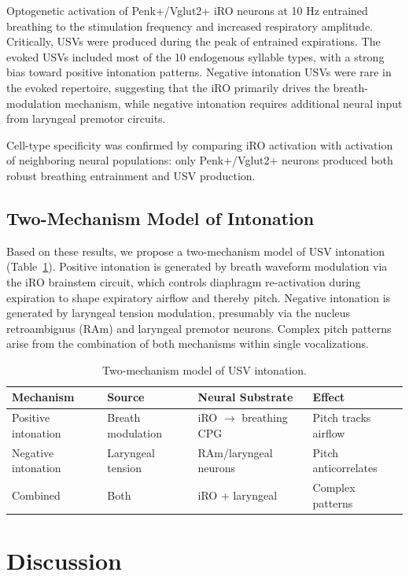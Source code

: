 \documentclass[11pt]{article}
\begin{document}
Optogenetic activation of Penk+/Vglut2+ iRO neurons at 10 Hz entrained breathing to the stimulation frequency and increased respiratory amplitude. Critically, USVs were produced during the peak of entrained expirations. The evoked USVs included most of the 10 endogenous syllable types, with a strong bias toward positive intonation patterns. Negative intonation USVs were rare in the evoked repertoire, suggesting that the iRO primarily drives the breath-modulation mechanism, while negative intonation requires additional neural input from laryngeal premotor circuits.

Cell-type specificity was confirmed by comparing iRO activation with activation of neighboring neural populations: only Penk+/Vglut2+ neurons produced both robust breathing entrainment and USV production.

\subsection{Two-Mechanism Model of Intonation}

Based on these results, we propose a two-mechanism model of USV intonation (Table~\ref{tab:model}). Positive intonation is generated by breath waveform modulation via the iRO brainstem circuit, which controls diaphragm re-activation during expiration to shape expiratory airflow and thereby pitch. Negative intonation is generated by laryngeal tension modulation, presumably via the nucleus retroambiguus (RAm) and laryngeal premotor neurons. Complex pitch patterns arise from the combination of both mechanisms within single vocalizations.

\begin{table}[h]
\centering
\caption{Two-mechanism model of USV intonation.}
\label{tab:model}
\begin{tabular}{llll}
\toprule
Mechanism & Source & Neural Substrate & Effect \\
\midrule
Positive intonation & Breath modulation & iRO $\rightarrow$ breathing CPG & Pitch tracks airflow \\
Negative intonation & Laryngeal tension & RAm/laryngeal neurons & Pitch anticorrelates \\
Combined & Both & iRO + laryngeal & Complex patterns \\
\bottomrule
\end{tabular}
\end{table}

\section{Discussion}
\end{document}

